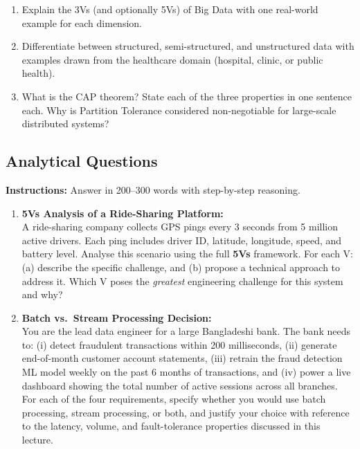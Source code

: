 \documentclass[12pt,a4paper]{article}
\begin{document}
\begin{enumerate}[label=\textbf{D\arabic*.}, leftmargin=2.5em, itemsep=8pt]
  \item Explain the 3Vs (and optionally 5Vs) of Big Data with one real-world example for each dimension.
  \item Differentiate between structured, semi-structured, and unstructured data with examples drawn from the healthcare domain (hospital, clinic, or public health).
  \item What is the CAP theorem? State each of the three properties in one sentence each. Why is Partition Tolerance considered non-negotiable for large-scale distributed systems?
\end{enumerate}

\subsection*{Analytical Questions}
\noindent\textbf{Instructions:} Answer in 200--300 words with step-by-step reasoning.

\begin{enumerate}[label=\textbf{A\arabic*.}, leftmargin=2.5em, itemsep=8pt]
  \item \textbf{5Vs Analysis of a Ride-Sharing Platform:}\\
  A ride-sharing company collects GPS pings every 3 seconds from 5 million active drivers. Each ping includes driver ID, latitude, longitude, speed, and battery level. Analyse this scenario using the full \textbf{5Vs} framework. For each V: (a) describe the specific challenge, and (b) propose a technical approach to address it. Which V poses the \textit{greatest} engineering challenge for this system and why?

  \item \textbf{Batch vs.\ Stream Processing Decision:}\\
  You are the lead data engineer for a large Bangladeshi bank. The bank needs to: (i) detect fraudulent transactions within 200 milliseconds, (ii) generate end-of-month customer account statements, (iii) retrain the fraud detection ML model weekly on the past 6 months of transactions, and (iv) power a live dashboard showing the total number of active sessions across all branches. For each of the four requirements, specify whether you would use batch processing, stream processing, or both, and justify your choice with reference to the latency, volume, and fault-tolerance properties discussed in this lecture.
\end{enumerate}
\end{document}
